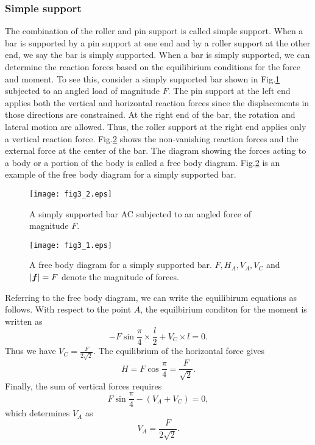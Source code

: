 \documentclass[10pt,a4j]{article}
\begin{document}
\subsubsection{Simple support}
The combination of the roller and pin support is called simple support. 
When a bar is supported by a pin support at one end and by a roller 
support at the other end, we say the bar is simply supported. 
When a bar is simply supported, we can determine the reaction forces 
based on the equilibirium conditions for the force and moment. 
To see this, consider a simply supported bar shown in Fig.\ref{fig:fig3_2}
subjected to an angled load of magnitude $F$.
The pin support at the left end applies both the vertical and horizontal reaction forces 
since the displacements in those directions are constrained.
At the right end of the bar, the rotation and lateral motion are allowed.
Thus, the roller support at the right end applies only a vertical reaction force.
Fig.\ref{fig:fig3_1} shows the non-vanishing reaction forces and the external 
force at the center of the bar. The diagram showing the forces acting to a body or 
a portion of the body is called a free body diagram. Fig.\ref{fig:fig3_1} is an example 
of the free body diagram for a simply supported bar.
\begin{figure}[h]
	\begin{center}
	\texttt{[image: fig3\_2.eps]} 
	\end{center}
	\caption{A simply supported bar AC subjected to an angled force of magnitude $F$.}
	\label{fig:fig3_2}
\end{figure}
\begin{figure}[h]
	\begin{center}
	\texttt{[image: fig3\_1.eps]} 
	\end{center}
	\caption{
		A free body diagram for a simply supported bar.
		$F, H_A, V_A, V_C$ and $|\mbox{\boldmath $f$}|=F$ denote the magnitude of forces.
	}
	\label{fig:fig3_1}
\end{figure}
Referring to the free body diagram, we can write the equilibirum equations as follows. 
With respect to the point $A$, the equilbirium conditon for the moment is written as  
\[
	-F\sin\frac{\pi}{4}\times \frac{l}{2} + V_C\times l =0.
\]
Thus we have $V_C=\frac{F}{2\sqrt{2}}$. The equilibrium of the horizontal force gives
\[
	H=F\cos\frac{\pi}{4}=\frac{F}{\sqrt{2}}.
\]
Finally, the sum of vertical forces requires 
\[
	F\sin\frac{\pi}{4} -(V_A+V_C)=0, 
\]
which determines $V_A$ as 
\[
	V_A=\frac{F}{2\sqrt{2}}.
\]
\end{document}
